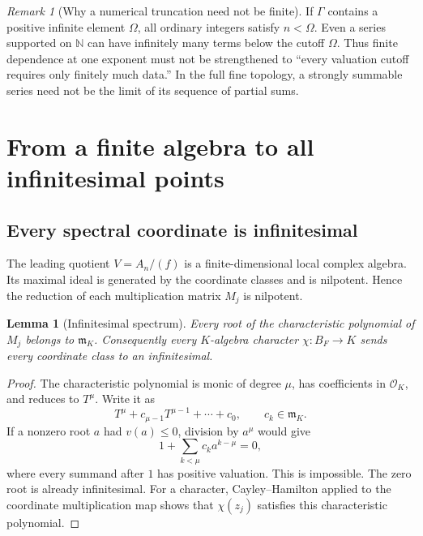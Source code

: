 \documentclass[11pt,letterpaper]{article}
\newtheorem{lemma}[lemma]{Lemma}
\theoremstyle{definition}
\theoremstyle{remark}
\newtheorem{remark}[remark]{Remark}
\newcommand{\N}{\mathbb N}
\newcommand{\OO}{\mathcal O}
\newcommand{\mm}{\mathfrak m}
\numberwithin{equation}{section}
\begin{document}
\begin{remark}[Why a numerical truncation need not be finite]
If $\Gamma$ contains a positive infinite element $\Omega$, all ordinary integers satisfy $n<\Omega$. Even a series supported on $\N$ can have infinitely many terms below the cutoff $\Omega$. Thus finite dependence at one exponent must not be strengthened to ``every valuation cutoff requires only finitely much data.'' In the full fine topology, a strongly summable series need not be the limit of its sequence of partial sums.
\end{remark}

\section{From a finite algebra to all infinitesimal points}\label{sec:points}
\subsection{Every spectral coordinate is infinitesimal}
The leading quotient $V=A_n/(f)$ is a finite-dimensional local complex algebra. Its maximal ideal is generated by the coordinate classes and is nilpotent. Hence the reduction of each multiplication matrix $M_j$ is nilpotent.

\begin{lemma}[Infinitesimal spectrum]\label{lem:spectrum}
Every root of the characteristic polynomial of $M_j$ belongs to $\mm_K$. Consequently every $K$-algebra character $\chi:B_F\to K$ sends every coordinate class to an infinitesimal.
\end{lemma}
\begin{proof}
The characteristic polynomial is monic of degree $\mu$, has coefficients in $\OO_K$, and reduces to $T^\mu$. Write it as
\[
 T^\mu+c_{\mu-1}T^{\mu-1}+\cdots+c_0,
 \qquad c_k\in\mm_K.
\]
If a nonzero root $a$ had $v(a)\leq0$, division by $a^\mu$ would give
\[
 1+\sum_{k<\mu}c_ka^{k-\mu}=0,
\]
where every summand after $1$ has positive valuation. This is impossible. The zero root is already infinitesimal. For a character, Cayley--Hamilton applied to the coordinate multiplication map shows that $\chi(z_j)$ satisfies this characteristic polynomial.
\end{proof}
\end{document}
